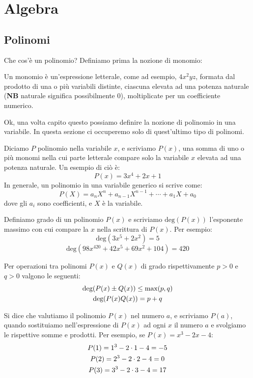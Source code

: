 \documentclass[11pt]{scrartcl}
\begin{document}
	\section{Algebra}
	
	
	\subsection{Polinomi}
	Che cos'è un polinomio? Definiamo prima la nozione di monomio:
	\begin{definition}
		Un monomio è un'espressione letterale, come ad esempio, $4x^2yz$, formata dal prodotto di una o più variabili distinte, ciascuna elevata ad una potenza naturale (\textbf{NB} naturale significa possibilmente $0$), moltiplicate per un coefficiente numerico.
	\end{definition}
	Ok, una volta capito questo possiamo definire la nozione di polinomio in una variabile. In questa sezione ci occuperemo solo di quest'ultimo tipo di polinomi.
	\begin{definition}
		\label{polinomio}
		Diciamo $P$ polinomio nella variabile $x$, e scriviamo $P(x)$, una somma di uno o più monomi nella cui parte letterale compare solo la variabile $x$ elevata ad una potenza naturale. Un esempio di ciò è:
		$$P(x)=3x^4+2x+1$$
		In generale, un polinomio in una variabile generico si scrive come:
		$$P(X)=a_nX^n  + a_{n-1}X^{n-1} +\cdots + a_1 X+ a_0$$
		dove gli $a_i$ sono coefficienti, e $X$ è la variabile.
		
	\end{definition}
	\begin{definition}
		Definiamo grado di un polinomio $P(x)$ e scriviamo $\text{deg}(P(x))$ l'esponente massimo con cui compare la $x$ nella scrittura di $P(x)$. Per esempio:
		$$\text{deg}(3x^5+2x^2)=5$$
		$$\text{deg}(98x^{420}+42x^5+69x^2+104)=420$$
	\end{definition}
	\begin{theorem}
		Per operazioni tra polinomi $P(x)$ e $Q(x)$ di grado rispettivamente $p>0$ e $q>0$ valgono le seguenti:
		\begin{gather}
			\notag \text{deg}(P(x) \pm Q(x)) \le \text{max}(p,q) \\
			\notag \text{deg}(P(x)Q(x)) = p + q
		\end{gather}
	\end{theorem}
	\begin{definition}
		Si dice che valutiamo il polinomio $P(x)$ nel numero $a$, e scriviamo $P(a)$, quando sostituiamo nell'espressione di $P(x)$ ad ogni $x$ il numero $a$ e svolgiamo le rispettive somme e prodotti. Per esempio, se $P(x)=x^3-2x-4$:
		\begin{gather} \notag
			P(1)=1^3-2\cdot1-4=-5 \\ \notag
			P(2)=2^3-2\cdot2-4=0 \\ \notag
			P(3)=3^3-2\cdot3-4=17  \notag
		\end{gather}
	\end{definition}
\end{document}
